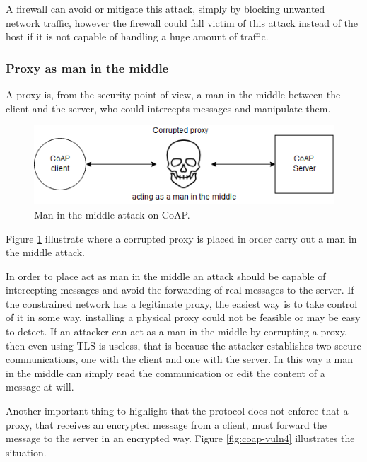	A firewall can avoid or mitigate this attack, simply by blocking unwanted network traffic, however the firewall could fall victim of this attack instead of the host if it is not capable of handling a huge amount of traffic.\newline
	
	\subsubsection{Proxy as man in the middle}
	A proxy is, from the security point of view, a man in the middle between the client and the server, who could intercepts messages and manipulate them.
	
	\begin{figure}
		\includegraphics[width=\linewidth]{coap-vuln-img3.png}
		\caption{Man in the middle attack on CoAP.}
		\label{fig:coap-vuln3}
	\end{figure}
	
	Figure \ref{fig:coap-vuln3} illustrate where a corrupted proxy is placed in order carry out a man in the middle attack.\newline
	
	In order to place act as man in the middle an attack should be capable of intercepting messages and avoid the forwarding of real messages to the server.\newline
	If the constrained network has a legitimate proxy, the easiest way is to take control of it in some way, installing a physical proxy could not be feasible or may be easy to detect.\newline
	If an attacker can act as a man in the middle by corrupting a proxy, then even using TLS is useless, that is because the attacker establishes two secure communications, one with the client and one with the server.\newline
	In this way a man in the middle can simply read the communication or edit the content of a message at will.\newline
	
	Another important thing to highlight that the protocol does not enforce that a proxy, that receives an encrypted message from a client, must forward the message to the server in an encrypted way.
	Figure \ref{fig:coap-vuln4} illustrates the situation.\newline
	
